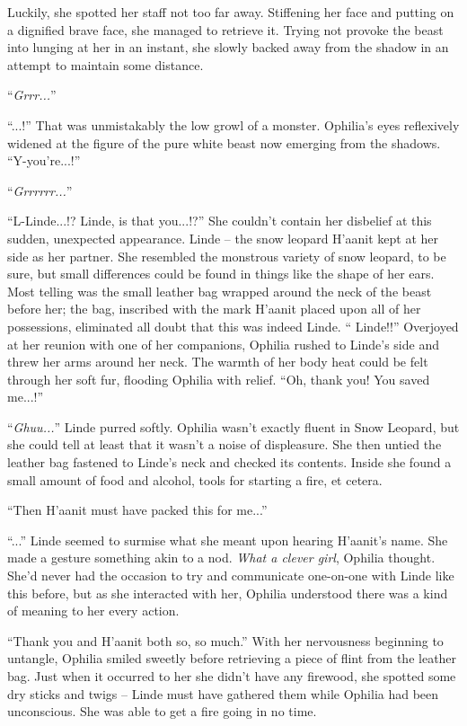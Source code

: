 Luckily, she spotted her staff not too far away. Stiffening her face and putting on a dignified brave face, she managed to retrieve it. Trying not provoke the beast into lunging at her in an instant, she slowly backed away from the shadow in an attempt to maintain some distance.

``\emph{Grrr...}''

``...!'' That was unmistakably the low growl of a monster. Ophilia's eyes reflexively widened at the figure of the pure white beast now emerging from the shadows. ``Y-you're...!''

``\emph{Grrrrrr...}''

``L-Linde...!? Linde, is that you...!?'' She couldn't contain her disbelief at this sudden, unexpected appearance. Linde -- the snow leopard H'aanit kept at her side as her partner. She resembled the monstrous variety of snow leopard, to be sure, but small differences could be found in things like the shape of her ears. Most telling was the small leather bag wrapped around the neck of the beast before her; the bag, inscribed with the mark H'aanit placed upon all of her possessions, eliminated all doubt that this was indeed Linde. `` Linde!!'' Overjoyed at her reunion with one of her companions, Ophilia rushed to Linde's side and threw her arms around her neck. The warmth of her body heat could be felt through her soft fur, flooding Ophilia with relief. ``Oh, thank you! You saved me...!''

``\emph{Ghuu...}'' Linde purred softly. Ophilia wasn't exactly fluent in Snow Leopard, but she could tell at least that it wasn't a noise of displeasure. She then untied the leather bag fastened to Linde's neck and checked its contents. Inside she found a small amount of food and alcohol, tools for starting a fire, et cetera.

``Then H'aanit must have packed this for me...''

``...'' Linde seemed to surmise what she meant upon hearing H'aanit's name. She made a gesture something akin to a nod. \emph{What a clever girl}, Ophilia thought. She'd never had the occasion to try and communicate one-on-one with Linde like this before, but as she interacted with her, Ophilia understood there was a kind of meaning to her every action.

``Thank you and H'aanit both so, so much.'' With her nervousness beginning to untangle, Ophilia smiled sweetly before retrieving a piece of flint from the leather bag. Just when it occurred to her she didn't have any firewood, she spotted some dry sticks and twigs -- Linde must have gathered them while Ophilia had been unconscious. She was able to get a fire going in no time.

